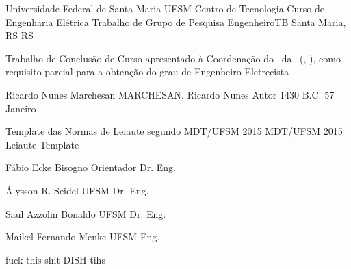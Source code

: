 \set{\universidade}				{Universidade Federal de Santa Maria}
\set{\universidadeSigla}		{UFSM}
\set{\centroCurso}				{Centro de Tecnologia}
\set{\departamentoPrograma}		{Curso de Engenharia Elétrica}
\set{\grauTrabalho}				{Trabalho de Grupo de Pesquisa}
\set{\grauTitulacao}			{EngenheiroTB}
\set{\cidadeCEP}				{Santa Maria, RS}
\set{\estadoCEP}				{RS}

\set{\textoFolhaRosto}			{Trabalho de Conclusão de Curso apresentado à Coordenação do \departamentoPrograma\ da \universidade\ (\universidadeSigla , \estadoCEP), como requisito parcial para a obtenção do grau de}
\set{\grauFolhaRosto}			{Engenheiro Eletrecista}

\set{\autor}					{Ricardo Nunes Marchesan}
\set{\autorCitacao}				{MARCHESAN, Ricardo Nunes}
\set{\autorGenero}				{Autor}
\set{\ano}						{1430 B.C.}
\set{\diaDefesa}				{57}
\set{\mesDefesa}				{Janeiro}

\set{\tituloTrabalho}			{Template das Normas de Leiaute segundo MDT/UFSM 2015}
\set{\tituloTrabalhoEn}			{MDT/UFSM 2015 Leiaute Template}


\set{\orientador}				{Fábio Ecke Bisogno}
\set{\orientadorGenero}			{Orientador}
\set{\orientadorTitulo}			{Dr. Eng.}

\set{\bancaUm}					{Álysson R. Seidel}
\set{\bancaUmSigla}				{UFSM}
\set{\bancaUmTitulo}			{Dr. Eng.}

\set{\bancaDois}				{Saul Azzolin Bonaldo}
\set{\bancaDoisSigla}			{UFSM}
\set{\bancaDoisTitulo}			{Dr. Eng.}

\set{\bancaTres}				{Maikel Fernando Menke}
\set{\bancaTresSigla}			{UFSM}
\set{\bancaTresTitulo}			{Eng.}

\set{\bancaQuatro}				{fuck this shit}
\set{\bancaQuatroSigla}			{DISH}
\set{\bancaQuatroTitulo}		{tihs}
